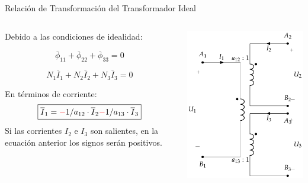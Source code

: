 \documentclass[aspectratio=169, usenames,svgnames,dvipsnames]{beamer}
\begin{document}
\begin{frame}[label={sec:org3b0a304}]{Relación de Transformación del Transformador Ideal}
\begin{columns}
\begin{column}{0.5\columnwidth}
Debido a las condiciones de idealidad:

\[
  \overline{\phi}_{11} + \overline{\phi}_{22} + \overline{\phi}_{33} = 0
\]

\[
  N_1 \overline{I}_1 + N_ 2\overline{I}_2 + N_3 \overline{I}_{3} = 0
\]

En términos de corriente:
\[
  \boxed{\overline{I}_1 = {\color{red}-} 1/a_{12} \cdot \overline{I}_2 {\color{red}-} 1/a_{13} \cdot  \overline{I}_3}
\]
Si las corrientes \(I_2\) e \(I_3\) son salientes, en la ecuación anterior los signos serán positivos.
\end{column}
\begin{column}{0.5\columnwidth}
\begin{center}
\includegraphics[height=0.9\textheight]{../figs/TrafoIdealVariosDevanados.pdf}
\end{center}
\end{column}
\end{columns}
\end{frame}
\end{document}
